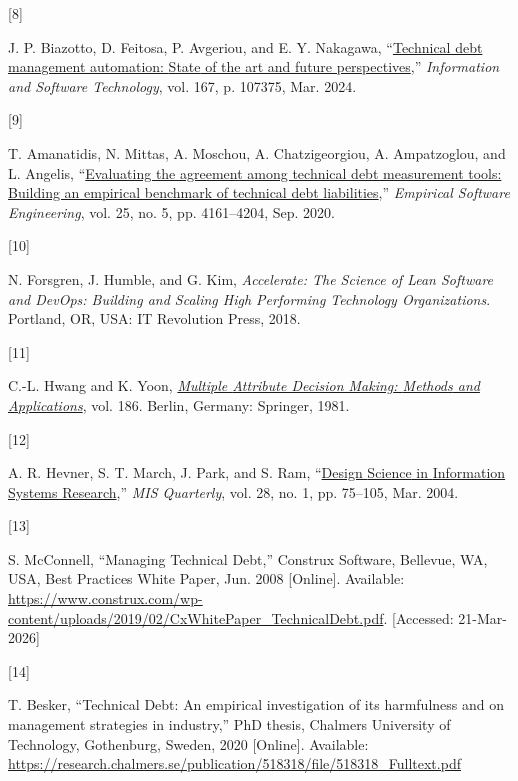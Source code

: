 \documentclass[
  journal,
]{IEEEtran}%
\newlength{\cslhangindent}
\newlength{\csllabelwidth}
\newenvironment{CSLReferences}[2] %
 {\begin{list}{}{%
  \setlength{\itemindent}{0pt}
  \setlength{\leftmargin}{0pt}
  \setlength{\parsep}{0pt}
  \ifodd #1
   \setlength{\leftmargin}{\cslhangindent}
   \setlength{\itemindent}{-1\cslhangindent}
  \fi
  \setlength{\itemsep}{#2\baselineskip}}}
 {\end{list}}
\newcommand{\CSLLeftMargin}[1]{\parbox[t]{\csllabelwidth}{\strut#1\strut}}
\newcommand{\CSLRightInline}[1]{\parbox[t]{\linewidth - \csllabelwidth}{\strut#1\strut}}
\begin{document}
\begin{CSLReferences}{0}{0}
\CSLLeftMargin{{[}8{]} }%
\CSLRightInline{J. P. Biazotto, D. Feitosa, P. Avgeriou, and E. Y.
Nakagawa,
{``\href{https://doi.org/10.1016/j.infsof.2023.107375}{Technical debt
management automation: {State} of the art and future perspectives},''}
\emph{Information and Software Technology}, vol. 167, p. 107375, Mar.
2024. }

\CSLLeftMargin{{[}9{]} }%
\CSLRightInline{T. Amanatidis, N. Mittas, A. Moschou, A. Chatzigeorgiou,
A. Ampatzoglou, and L. Angelis,
{``\href{https://doi.org/10.1007/s10664-020-09869-w}{Evaluating the
agreement among technical debt measurement tools: Building an empirical
benchmark of technical debt liabilities},''} \emph{Empirical Software
Engineering}, vol. 25, no. 5, pp. 4161--4204, Sep. 2020. }

\CSLLeftMargin{{[}10{]} }%
\CSLRightInline{N. Forsgren, J. Humble, and G. Kim, \emph{Accelerate:
{The Science} of {Lean Software} and {DevOps}: {Building} and {Scaling
High Performing Technology Organizations}}. Portland, OR, USA: IT
Revolution Press, 2018. }

\CSLLeftMargin{{[}11{]} }%
\CSLRightInline{C.-L. Hwang and K. Yoon,
\emph{\href{https://doi.org/10.1007/978-3-642-48318-9}{Multiple
{Attribute Decision Making}: {Methods} and {Applications}}}, vol. 186.
Berlin, Germany: Springer, 1981. }

\CSLLeftMargin{{[}12{]} }%
\CSLRightInline{A. R. Hevner, S. T. March, J. Park, and S. Ram,
{``\href{https://doi.org/10.2307/25148625}{Design {Science} in
{Information Systems Research}},''} \emph{MIS Quarterly}, vol. 28, no.
1, pp. 75--105, Mar. 2004. }

\CSLLeftMargin{{[}13{]} }%
\CSLRightInline{S. McConnell, {``Managing {Technical Debt},''} Construx
Software, Bellevue, WA, USA, Best Practices White Paper, Jun. 2008
{[}Online{]}. Available:
\url{https://www.construx.com/wp-content/uploads/2019/02/CxWhitePaper_TechnicalDebt.pdf}.
{[}Accessed: 21-Mar-2026{]}}

\CSLLeftMargin{{[}14{]} }%
\CSLRightInline{T. Besker, {``Technical {Debt}: {An} empirical
investigation of its harmfulness and on management strategies in
industry,''} PhD thesis, Chalmers University of Technology, Gothenburg,
Sweden, 2020 {[}Online{]}. Available:
\url{https://research.chalmers.se/publication/518318/file/518318_Fulltext.pdf}}


\end{CSLReferences}
\end{document}

